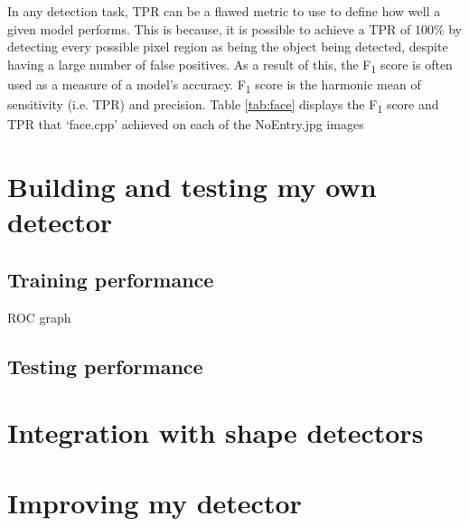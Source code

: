 \documentclass[onecolumn, 11pt, a4paper]{article}
\begin{document}
In any detection task, TPR can be a flawed metric to use to define how well a given model performs.
This is because, it is possible to achieve a TPR of 100\% by detecting every possible pixel region as being the object being detected, despite having a large number of false positives.
As a result of this, the F\textsubscript{1} score is often used as a measure of a model's accuracy.
F\textsubscript{1} score is the harmonic mean of sensitivity (i.e. TPR) and precision.
Table \ref{tab:face} displays the F\textsubscript{1} score and TPR that `face.cpp' achieved on each of the NoEntry\textasteriskcentered.jpg images

\clearpage

\section{Building and testing my own detector}

\subsection{Training performance}

ROC graph

\subsection{Testing performance}

\section{Integration with shape detectors}

\section{Improving my detector}



\clearpage

\printbibliography
    
\end{document}
